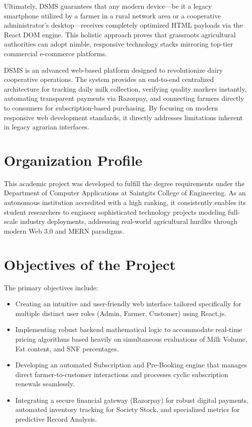\documentclass[12pt,a4paper]{report}
\begin{document}
Ultimately, DSMS guarantees that any modern device—be it a legacy smartphone utilized by a farmer in a rural network area or a cooperative administrator's desktop—receives completely optimized HTML payloads via the React DOM engine. This holistic approach proves that grassroots agricultural authorities can adopt nimble, responsive technology stacks mirroring top-tier commercial e-commerce platforms.
\vspace{0.5cm}

DSMS is an advanced web-based platform designed to revolutionize dairy cooperative operations. The system provides an end-to-end centralized architecture for tracking daily milk collection, verifying quality markers instantly, automating transparent payments via Razorpay, and connecting farmers directly to consumers for subscription-based purchasing. By focusing on modern responsive web development standards, it directly addresses limitations inherent in legacy agrarian interfaces.

\section{Organization Profile}
This academic project was developed to fulfill the degree requirements under the Department of Computer Applications at Saintgits College of Engineering. As an autonomous institution accredited with a high ranking, it consistently enables its student researchers to engineer sophisticated technology projects modeling full-scale industry deployments, addressing real-world agricultural hurdles through modern Web 3.0 and MERN paradigms.

\section{Objectives of the Project}
The primary objectives include:
\begin{itemize}
    \item Creating an intuitive and user-friendly web interface tailored specifically for multiple distinct user roles (Admin, Farmer, Customer) using React.js.
    \item Implementing robust backend mathematical logic to accommodate real-time pricing algorithms based heavily on simultaneous evaluations of Milk Volume, Fat content, and SNF percentages.
    \item Developing an automated Subscription and Pre-Booking engine that manages direct farmer-to-customer interactions and processes cyclic subscription renewals seamlessly.
    \item Integrating a secure financial gateway (Razorpay) for robust digital payments, automated inventory tracking for Society Stock, and specialized metrics for predictive Record Analysis.
\end{itemize}
\end{document}
